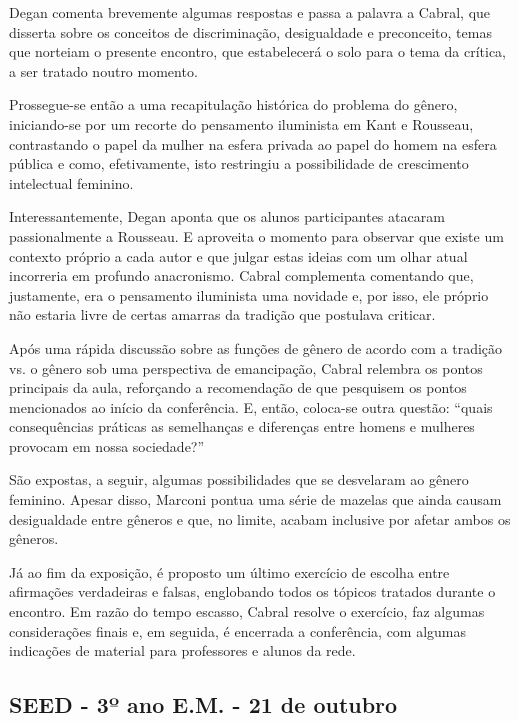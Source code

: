 \documentclass[12pt,a4paper]{article}
\begin{document}
	Degan comenta brevemente algumas respostas e passa a palavra a 
	Cabral, que disserta sobre os conceitos de discriminação, 
	desigualdade e preconceito, temas que norteiam o presente 
	encontro, que estabelecerá o solo para o tema da crítica, a 
	ser tratado noutro momento. 

	Prossegue-se então a uma recapitulação histórica do problema do 
	gênero, iniciando-se por um recorte do pensamento iluminista em 
	Kant e Rousseau, contrastando o papel da mulher na esfera 
	privada ao papel do homem na esfera pública e como, efetivamente, 
	isto restringiu a possibilidade de crescimento intelectual 
	feminino. 

	Interessantemente, Degan aponta que os alunos participantes 
	atacaram passionalmente a Rousseau. E aproveita o momento para 
	observar que existe um contexto próprio a cada autor e que 
	julgar estas ideias com um olhar atual incorreria em profundo 
	anacronismo. Cabral complementa comentando que, justamente, 
	era o pensamento iluminista uma novidade e, por isso, ele 
	próprio não estaria livre de certas amarras da tradição que 
	postulava criticar. 

	Após uma rápida discussão sobre as funções de gênero de acordo 
	com a tradição vs. o gênero sob uma perspectiva de emancipação, 
	Cabral relembra os pontos principais da aula, reforçando a 
	recomendação de que pesquisem os pontos mencionados ao início da 
	conferência. E, então, coloca-se outra questão: “quais consequências 
	práticas as semelhanças e diferenças entre homens e mulheres 
	provocam em nossa sociedade?” 

	São expostas, a seguir, algumas possibilidades que se desvelaram 
	ao gênero feminino. Apesar disso, Marconi pontua uma série de 
	mazelas que ainda causam desigualdade entre gêneros e que, no 
	limite, acabam inclusive por afetar ambos os gêneros. 

	Já ao fim da exposição, é proposto um último exercício de escolha 
	entre afirmações verdadeiras e falsas, englobando todos os tópicos 
	tratados durante o encontro. Em razão do tempo escasso, Cabral 
	resolve o exercício, faz algumas considerações finais e, em seguida, 
	é encerrada a conferência, com algumas indicações de material para 
	professores e alunos da rede. 

	\subsection{SEED - 3º ano E.M. - 21 de outubro}
\end{document}
